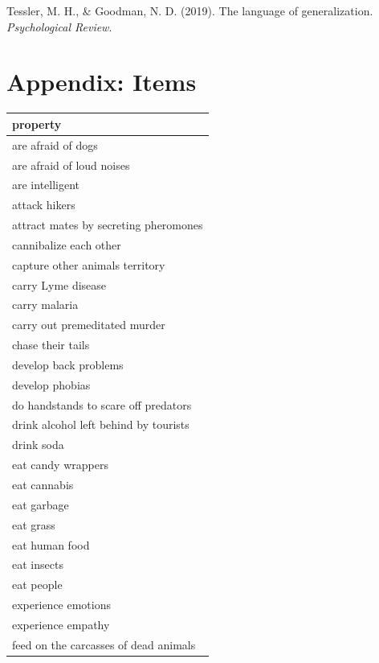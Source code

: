 \documentclass[floatsintext,doc]{apa6}
\begin{document}
\leavevmode\hypertarget{ref-Tessler2019psychrev}{}%
Tessler, M. H., \& Goodman, N. D. (2019). The language of generalization. \emph{Psychological Review}.

\newpage

\hypertarget{appendix-items}{%
\section{Appendix: Items}\label{appendix-items}}

\begingroup\fontsize{9pt}{10pt}\selectfont
\begin{longtable}{ |p{3in}|}
  \hline
{\bfseries property} \\ 
  \hline
are afraid of dogs \\ 
   \hline
are afraid of loud noises \\ 
   \hline
are intelligent \\ 
   \hline
attack hikers \\ 
   \hline
attract mates by secreting pheromones \\ 
   \hline
cannibalize each other \\ 
   \hline
capture other animals territory \\ 
   \hline
carry Lyme disease \\ 
   \hline
carry malaria \\ 
   \hline
carry out premeditated murder \\ 
   \hline
chase their tails \\ 
   \hline
develop back problems \\ 
   \hline
develop phobias \\ 
   \hline
do handstands to scare off predators \\ 
   \hline
drink alcohol left behind by tourists \\ 
   \hline
drink soda \\ 
   \hline
eat candy wrappers \\ 
   \hline
eat cannabis \\ 
   \hline
eat garbage \\ 
   \hline
eat grass \\ 
   \hline
eat human food \\ 
   \hline
eat insects \\ 
   \hline
eat people \\ 
   \hline
experience emotions \\ 
   \hline
experience empathy \\ 
   \hline
feed on the carcasses of dead animals \\ 

\end{longtable}
\end{document}
